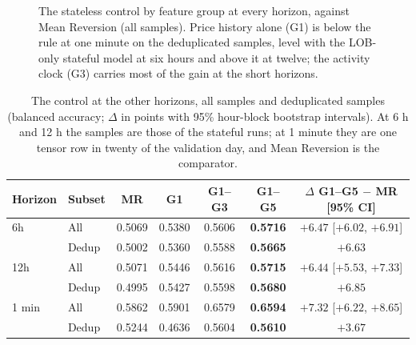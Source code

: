 \begin{figure}[t]
\centering

\caption{The stateless control by feature group at every horizon, against Mean Reversion
(all samples).  Price history alone (G1) is below the rule at one minute on the deduplicated
samples, level with the LOB-only stateful model at six hours and above it at twelve; the
activity clock (G3) carries most of the gain at the short horizons.}
\label{fig:stateless:groups}
\end{figure}

\begin{table}[t]
\centering
\caption{The control at the other horizons, all samples and deduplicated samples (balanced
accuracy; $\Delta$ in points with 95\% hour-block bootstrap intervals).  At 6 h and 12 h
the samples are those of the stateful runs; at 1 minute they are one tensor row in twenty
of the validation day, and Mean Reversion is the comparator.}
\label{tab:exp:nostate:horizons}
\small
\begin{fittable}\begin{tabular}{llccccc}
\toprule
Horizon & Subset & MR & G1 & G1--G3 & G1--G5 & $\Delta$ G1--G5 $-$ MR [95\% CI] \\
\midrule
6h    & All   & 0.5069 & 0.5380 & 0.5606 & \textbf{0.5716} & $+6.47$ [$+6.02$, $+6.91$] \\
      & Dedup & 0.5002 & 0.5360 & 0.5588 & \textbf{0.5665} & $+6.63$ \\
12h   & All   & 0.5071 & 0.5446 & 0.5616 & \textbf{0.5715} & $+6.44$ [$+5.53$, $+7.33$] \\
      & Dedup & 0.4995 & 0.5427 & 0.5598 & \textbf{0.5680} & $+6.85$ \\
1 min & All   & 0.5862 & 0.5901 & 0.6579 & \textbf{0.6594} & $+7.32$ [$+6.22$, $+8.65$] \\
      & Dedup & 0.5244 & 0.4636 & 0.5604 & \textbf{0.5610} & $+3.67$ \\
\bottomrule
\end{tabular}\end{fittable}
\end{table}

